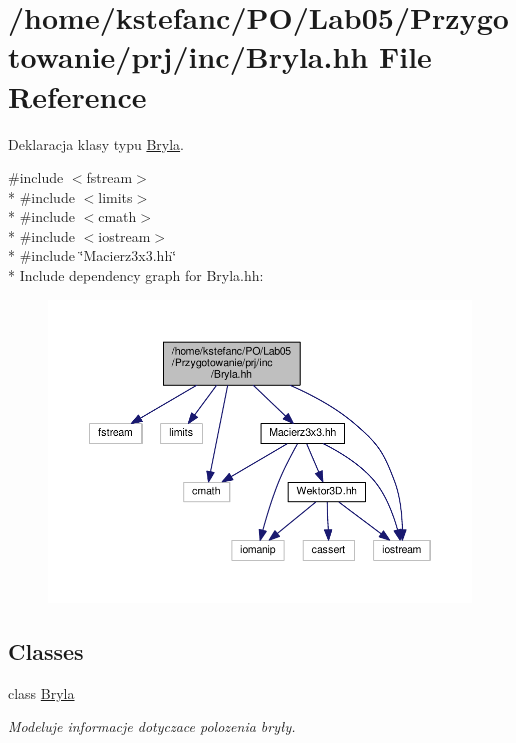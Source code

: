 \hypertarget{_bryla_8hh}{\section{/home/kstefanc/\+P\+O/\+Lab05/\+Przygotowanie/prj/inc/\+Bryla.hh File Reference}
\label{_bryla_8hh}
}


Deklaracja klasy typu \hyperlink{class_bryla}{Bryla}.  


{\ttfamily \#include $<$fstream$>$}\\*
{\ttfamily \#include $<$limits$>$}\\*
{\ttfamily \#include $<$cmath$>$}\\*
{\ttfamily \#include $<$iostream$>$}\\*
{\ttfamily \#include \char`\"{}Macierz3x3.\+hh\char`\"{}}\\*
Include dependency graph for Bryla.\+hh\+:\nopagebreak
\begin{figure}[H]
\begin{center}
\leavevmode
\includegraphics[width=350pt]{_bryla_8hh__incl}
\end{center}
\end{figure}
\subsection*{Classes}
\begin{DoxyCompactItemize}
\item 
class \hyperlink{class_bryla}{Bryla}
\begin{DoxyCompactList}\small\item\em Modeluje informacje dotyczace polozenia bryły. \end{DoxyCompactList}\end{DoxyCompactItemize}
